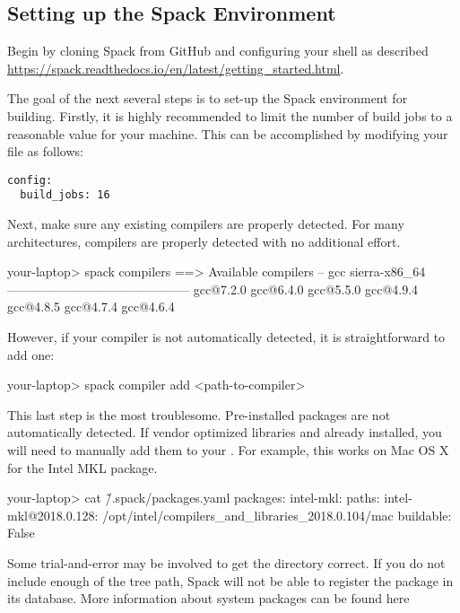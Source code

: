 \subsection{Setting up the Spack Environment}
Begin by cloning Spack from GitHub and configuring your shell as described
\url{https://spack.readthedocs.io/en/latest/getting_started.html}.

The goal of the next several steps is to set-up the Spack environment
for building. Firstly, it is highly recommended to limit the number of build jobs to
a reasonable value for your machine. This can be
accomplished by modifying your  file as follows:

\begin{lstlisting}[style=SHELL]
config:
  build_jobs: 16
\end{lstlisting}

Next, make sure any existing compilers are properly detected. For many
architectures, compilers are properly detected with no additional
effort.

\begin{shade}
your-laptop> spack compilers
==> Available compilers
-- gcc sierra-x86_64 --------------------------------------------
gcc@7.2.0  gcc@6.4.0  gcc@5.5.0  gcc@4.9.4  gcc@4.8.5  gcc@4.7.4  gcc@4.6.4
\end{shade}

However, if your compiler is not automatically detected, it is straightforward
to add one:

\begin{shade}
your-laptop> spack compiler add <path-to-compiler>
\end{shade}

This last step is the most troublesome. Pre-installed packages are not
automatically detected. If vendor optimized libraries and already installed,
you will need to manually add them to your
. For example, this works on Mac OS X for the Intel MKL package.

\begin{shade}
your-laptop> cat \~/.spack/packages.yaml
packages:
    intel-mkl:
        paths:
            intel-mkl@2018.0.128: /opt/intel/compilers_and_libraries_2018.0.104/mac
        buildable: False
\end{shade}

Some trial-and-error may be involved to get the directory correct. If
you do not include enough of the tree path, Spack will not be able to
register the package in its database. More information about system
packages can be found here

